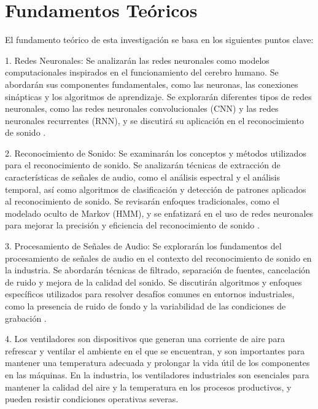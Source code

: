 \newpage
\setcounter{secnumdepth}{0}
\section{Fundamentos Teóricos}

              
El fundamento teórico de esta investigación se basa en los siguientes puntos clave:

1. Redes Neuronales: Se analizarán las redes neuronales como modelos computacionales inspirados en el funcionamiento del cerebro humano. Se abordarán sus componentes fundamentales, como las neuronas, las conexiones sinápticas y los algoritmos de aprendizaje. Se explorarán diferentes tipos de redes neuronales, como las redes neuronales convolucionales (CNN) y las redes neuronales recurrentes (RNN), y se discutirá su aplicación en el reconocimiento de sonido \cite{garciamurillo, frro,gtocoma,ehu}.

2. Reconocimiento de Sonido: Se examinarán los conceptos y métodos utilizados para el reconocimiento de sonido. Se analizarán técnicas de extracción de características de señales de audio, como el análisis espectral y el análisis temporal, así como algoritmos de clasificación y detección de patrones aplicados al reconocimiento de sonido. Se revisarán enfoques tradicionales, como el modelado oculto de Markov (HMM), y se enfatizará en el uso de redes neuronales para mejorar la precisión y eficiencia del reconocimiento de sonido \cite{tesisipn}.

3. Procesamiento de Señales de Audio: Se explorarán los fundamentos del procesamiento de señales de audio en el contexto del reconocimiento de sonido en la industria. Se abordarán técnicas de filtrado, separación de fuentes, cancelación de ruido y mejora de la calidad del sonido. Se discutirán algoritmos y enfoques específicos utilizados para resolver desafíos comunes en entornos industriales, como la presencia de ruido de fondo y la variabilidad de las condiciones de grabación \cite{cevallos}.

4. Los ventiladores son dispositivos que generan una corriente de aire para refrescar y ventilar el ambiente en el que se encuentran, y son importantes para mantener una temperatura adecuada y prolongar la vida útil de los componentes en las máquinas. En la industria, los ventiladores industriales son esenciales para mantener la calidad del aire y la temperatura en los procesos productivos, y pueden resistir condiciones operativas severas. 

